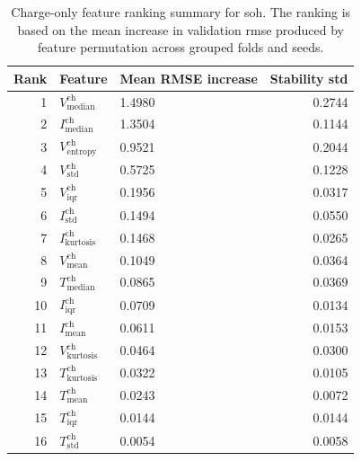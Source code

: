 \begin{table}[H]
    \centering
    \caption{Charge-only feature ranking summary for \ac{soh}. The ranking is based on the mean increase in validation \ac{rmse} produced by feature permutation across grouped folds and seeds.}
    \label{tab:charge_only_soh_ranking}
    \begin{tabular}{rllr}
    \toprule
    Rank & Feature & Mean RMSE increase & Stability std \\
    \midrule
    1 & $V_{\mathrm{median}}^{\mathrm{ch}}$ & 1.4980 & 0.2744 \\
    2 & $I_{\mathrm{median}}^{\mathrm{ch}}$ & 1.3504 & 0.1144 \\
    3 & $V_{\mathrm{entropy}}^{\mathrm{ch}}$ & 0.9521 & 0.2044 \\
    4 & $V_{\mathrm{std}}^{\mathrm{ch}}$ & 0.5725 & 0.1228 \\
    5 & $V_{\mathrm{iqr}}^{\mathrm{ch}}$ & 0.1956 & 0.0317 \\
    6 & $I_{\mathrm{std}}^{\mathrm{ch}}$ & 0.1494 & 0.0550 \\
    7 & $I_{\mathrm{kurtosis}}^{\mathrm{ch}}$ & 0.1468 & 0.0265 \\
    8 & $V_{\mathrm{mean}}^{\mathrm{ch}}$ & 0.1049 & 0.0364 \\
    9 & $T_{\mathrm{median}}^{\mathrm{ch}}$ & 0.0865 & 0.0369 \\
    10 & $I_{\mathrm{iqr}}^{\mathrm{ch}}$ & 0.0709 & 0.0134 \\
    11 & $I_{\mathrm{mean}}^{\mathrm{ch}}$ & 0.0611 & 0.0153 \\
    12 & $V_{\mathrm{kurtosis}}^{\mathrm{ch}}$ & 0.0464 & 0.0300 \\
    13 & $T_{\mathrm{kurtosis}}^{\mathrm{ch}}$ & 0.0322 & 0.0105 \\
    14 & $T_{\mathrm{mean}}^{\mathrm{ch}}$ & 0.0243 & 0.0072 \\
    15 & $T_{\mathrm{iqr}}^{\mathrm{ch}}$ & 0.0144 & 0.0144 \\
    16 & $T_{\mathrm{std}}^{\mathrm{ch}}$ & 0.0054 & 0.0058 \\
    \bottomrule
    \end{tabular}
\end{table}

